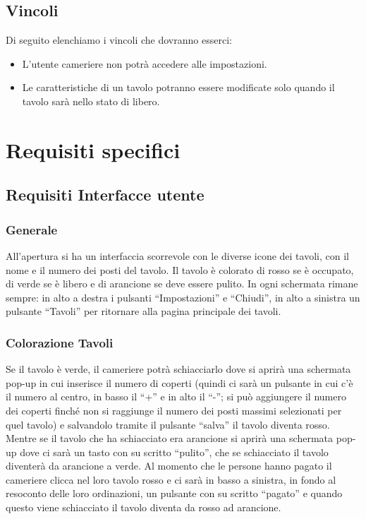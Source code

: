 \documentclass[12pt, letterpaper]{book}
\begin{document}
\subsection{Vincoli}
Di seguito elenchiamo i vincoli che dovranno esserci:
\begin{itemize}
    \item L'utente cameriere non potrà accedere alle impostazioni.
    \item Le caratteristiche di un tavolo potranno essere modificate solo quando il tavolo sarà nello stato di libero.
\end{itemize}



\section{Requisiti specifici}
\subsection{Requisiti Interfacce utente}
\subsubsection{Generale}
All'apertura si ha un interfaccia scorrevole con le diverse icone dei tavoli, con il nome e il numero dei posti del tavolo. Il tavolo è colorato di rosso se è occupato, di verde se è libero e di arancione se deve essere pulito.
In ogni schermata rimane sempre: in alto a destra i pulsanti “Impostazioni” e “Chiudi”, in alto a sinistra un pulsante “Tavoli” per ritornare alla pagina principale dei tavoli.
\subsubsection{Colorazione Tavoli}
Se il tavolo è verde, il cameriere potrà schiacciarlo dove si aprirà una schermata pop-up in cui inserisce il numero di coperti (quindi ci sarà un pulsante in cui c'è il numero al centro, in basso il “+” e in alto il “-”; si può aggiungere il numero dei coperti finché non si raggiunge il numero dei posti massimi selezionati per quel tavolo) e salvandolo tramite il pulsante “salva” il tavolo diventa rosso. Mentre se il tavolo che ha schiacciato era arancione si aprirà una schermata pop-up dove ci sarà un tasto con su scritto “pulito”, che se schiacciato il tavolo diventerà da arancione a verde. Al momento che le persone hanno pagato il cameriere clicca nel loro tavolo rosso e ci sarà in basso a sinistra, in fondo al resoconto delle loro ordinazioni, un pulsante con su scritto “pagato” e quando questo viene schiacciato il tavolo diventa da rosso ad arancione.
\end{document}
